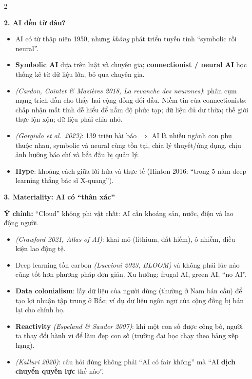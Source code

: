 \documentclass[10pt]{article}
\newcommand{\kw}[1]{\textbf{#1}}
\newcommand{\ct}[1]{{\color{h1}\itshape(#1)}}
\newcommand{\sect}[1]{\par\vspace{6pt}\noindent\colorbox{h1}{\parbox{\dimexpr\linewidth-2\fboxsep}{\large\bfseries\color{white}#1}}\par\vspace{2pt}}
\newcommand{\idea}[1]{\par\noindent\colorbox{bg}{\parbox{\dimexpr\linewidth-2\fboxsep}{\textbf{Ý chính:} #1}}\par}
\begin{document}
\begin{multicols}{2}
\sect{2. AI đến từ đâu?}
\begin{itemize}
\item AI có từ thập niên 1950, nhưng \emph{không} phát triển tuyến tính ``symbolic rồi neural''.
\item \kw{Symbolic AI} dựa trên luật và chuyên gia; \kw{connectionist / neural AI} học thống kê từ dữ liệu lớn, bỏ qua chuyên gia.
\item \ct{Cardon, Cointet \& Mazières 2018, \emph{La revanche des neurones}}: phân cụm mạng trích dẫn cho thấy hai cộng đồng đối đầu. Niềm tin của connectionists: chấp nhận mất tính dễ hiểu để nắm độ phức tạp; dữ liệu đủ dư thừa; thế giới thực lộn xộn; dữ liệu phải chia nhỏ.
\item \ct{Gargiulo et al.\ 2023}: 139 triệu bài báo $\Rightarrow$ AI là nhiều ngành con phụ thuộc nhau, symbolic và neural cùng tồn tại, chia lý thuyết/ứng dụng, chịu ảnh hưởng báo chí và bắt đầu bị quản lý.
\item \kw{Hype}: khoảng cách giữa lời hứa và thực tế (Hinton 2016: ``trong 5 năm deep learning thắng bác sĩ X-quang'').
\end{itemize}

\sect{3. Materiality: AI có ``thân xác''}
\idea{``Cloud'' không phi vật chất: AI cần khoáng sản, nước, điện và lao động người.}
\begin{itemize}
\item \ct{Crawford 2021, \emph{Atlas of AI}}: khai mỏ (lithium, đất hiếm), ô nhiễm, điều kiện lao động tệ.
\item Deep learning tốn carbon \ct{Luccioni 2023, BLOOM} và không phải lúc nào cũng tốt hơn phương pháp đơn giản. Xu hướng: frugal AI, green AI, ``no AI''.
\item \kw{Data colonialism}: lấy dữ liệu của người dùng (thường ở Nam bán cầu) để tạo lợi nhuận tập trung ở Bắc; ví dụ dữ liệu ngôn ngữ của cộng đồng bị bán lại cho chính họ.
\item \kw{Reactivity} \ct{Espeland \& Sauder 2007}: khi một con số được công bố, người ta thay đổi hành vi để làm đẹp con số (trường đại học chạy theo bảng xếp hạng).
\item \ct{Kalluri 2020}: câu hỏi đúng không phải ``AI có fair không'' mà ``AI \kw{dịch chuyển quyền lực} thế nào''.
\end{itemize}


\end{multicols}
\end{document}

